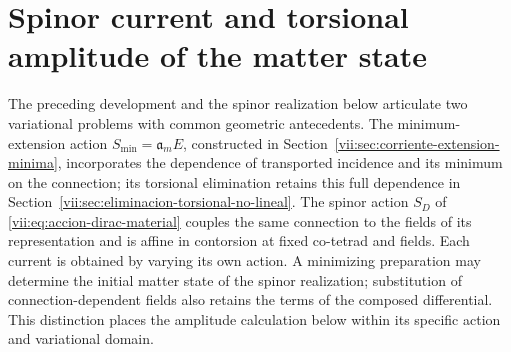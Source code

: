 
\section{Spinor current and torsional amplitude of the matter state}
\label{vii:sec:corriente-espinorial-densidad}

The preceding development and the spinor realization below articulate
two variational problems with common geometric antecedents. The
minimum-extension action \(S_{\min}=\mathfrak a_m E\), constructed
in Section~\ref{vii:sec:corriente-extension-minima}, incorporates the
dependence of transported incidence and its minimum on the connection;
its torsional elimination retains this full dependence in
Section~\ref{vii:sec:eliminacion-torsional-no-lineal}. The spinor
action \(S_D\) of \eqref{vii:eq:accion-dirac-material} couples
the same connection to the fields of its representation and is affine
in contorsion at fixed co-tetrad and fields. Each current is obtained
by varying its own action. A minimizing preparation may determine
the initial matter state of the spinor realization; substitution of
connection-dependent fields also retains the terms of the composed
differential. This distinction places the amplitude calculation below
within its specific action and variational domain.

